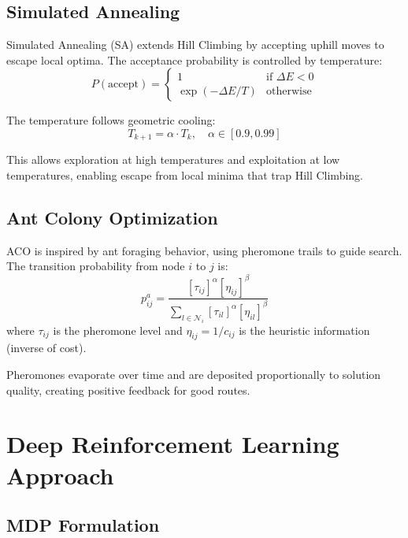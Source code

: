 \documentclass[11pt,a4paper]{article}
\begin{document}
\subsection{Simulated Annealing}

Simulated Annealing (SA) extends Hill Climbing by accepting uphill moves to escape local optima. The acceptance probability is controlled by temperature:
\begin{equation}
P(\text{accept}) =
\begin{cases}
1 & \text{if } \Delta E < 0 \\
\exp\left( -\Delta E / T \right) & \text{otherwise}
\end{cases}
\end{equation}

The temperature follows geometric cooling:
\begin{equation}
T_{k+1} = \alpha \cdot T_k, \quad \alpha \in [0.9, 0.99]
\end{equation}

This allows exploration at high temperatures and exploitation at low temperatures, enabling escape from local minima that trap Hill Climbing.

\subsection{Ant Colony Optimization}

ACO is inspired by ant foraging behavior, using pheromone trails to guide search. The transition probability from node $i$ to $j$ is:
\begin{equation}
p_{ij}^a = \frac{[\tau_{ij}]^\alpha [\eta_{ij}]^\beta}{\sum_{l \in \mathcal{N}_i} [\tau_{il}]^\alpha [\eta_{il}]^\beta}
\end{equation}
where $\tau_{ij}$ is the pheromone level and $\eta_{ij} = 1/c_{ij}$ is the heuristic information (inverse of cost).

Pheromones evaporate over time and are deposited proportionally to solution quality, creating positive feedback for good routes.

\section{Deep Reinforcement Learning Approach}

\subsection{MDP Formulation}
\end{document}
